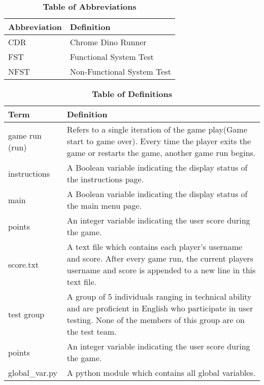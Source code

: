 \documentclass[12pt, titlepage]{article}
\begin{document}
\begin{table}[H]
\caption{\textbf{Table of Abbreviations}} \label{Table}

\begin{tabularx}{\textwidth}{p{3cm}X}
\toprule
\textbf{Abbreviation} & \textbf{Definition} \\
\midrule
CDR & Chrome Dino Runner\\
FST & Functional System Test\\
NFST & Non-Functional System Test\\
\bottomrule
\end{tabularx}

\end{table}

\begin{table}[H]
\caption{\textbf{Table of Definitions}} \label{Table}

\begin{tabularx}{\textwidth}{p{3cm}X}
\toprule
\textbf{Term} & \textbf{Definition}\\
\midrule

game run (run) & Refers to a single iteration of the game play(Game start to game over). Every time the player exits the game or restarts the game, another game run begins.\\

instructions & A Boolean variable indicating the display status of the instructions page.\\

main & A Boolean variable indicating the display status of the main menu page. \\

points & An integer variable indicating the user score during the game. \\

score.txt & A text file which contains each player's username and score. After every game run, the current players username and score is appended to a new line in this text file.\\

test group & A group of 5 individuals ranging in technical ability and are proficient in English who participate in user testing. None of the members of this group are on the test team.  \\

points & An integer variable indicating the user score during the game. \\

global_var.py & A python module which contains all global variables. \\

\bottomrule
\end{tabularx}

\end{table}	
\end{document}
